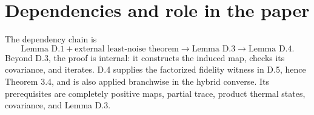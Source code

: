 \documentclass[11pt]{article}
\begin{document}
\section{Dependencies and role in the paper}

The dependency chain is
\[
  \text{Lemma D.1}
  +\text{external least-noise theorem}
  \longrightarrow\text{Lemma D.3}
  \longrightarrow\text{Lemma D.4}.
\]
Beyond D.3, the proof is internal: it constructs the induced map, checks its
covariance, and iterates.  D.4 supplies the factorized fidelity witness in
D.5, hence Theorem 3.4, and is also applied branchwise in the hybrid converse.
Its prerequisites are completely positive maps, partial trace, product
thermal states, covariance, and Lemma D.3.
\end{document}
